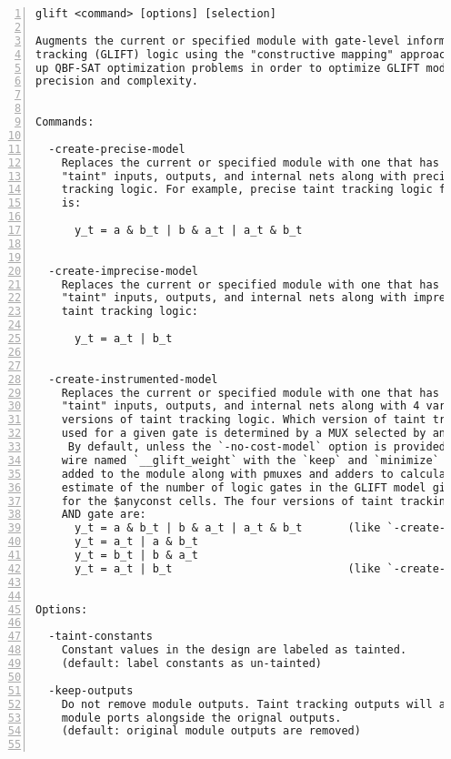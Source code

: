\begin{lstlisting}[numbers=left,frame=single]
    glift <command> [options] [selection]

Augments the current or specified module with gate-level information flow 
tracking (GLIFT) logic using the "constructive mapping" approach. Also can set
up QBF-SAT optimization problems in order to optimize GLIFT models or trade off
precision and complexity.


Commands:

  -create-precise-model
    Replaces the current or specified module with one that has corresponding
    "taint" inputs, outputs, and internal nets along with precise taint
    tracking logic. For example, precise taint tracking logic for an AND gate
    is:

      y_t = a & b_t | b & a_t | a_t & b_t


  -create-imprecise-model
    Replaces the current or specified module with one that has corresponding
    "taint" inputs, outputs, and internal nets along with imprecise "All OR"
    taint tracking logic:

      y_t = a_t | b_t


  -create-instrumented-model
    Replaces the current or specified module with one that has corresponding
    "taint" inputs, outputs, and internal nets along with 4 varying-precision
    versions of taint tracking logic. Which version of taint tracking logic is
    used for a given gate is determined by a MUX selected by an $anyconst cell.
     By default, unless the `-no-cost-model` option is provided, an additional
    wire named `__glift_weight` with the `keep` and `minimize` attributes is
    added to the module along with pmuxes and adders to calculate a rough
    estimate of the number of logic gates in the GLIFT model given an assignment
    for the $anyconst cells. The four versions of taint tracking logic for an
    AND gate are:
      y_t = a & b_t | b & a_t | a_t & b_t       (like `-create-precise-model`)
      y_t = a_t | a & b_t
      y_t = b_t | b & a_t
      y_t = a_t | b_t                           (like `-create-imprecise-model`)


Options:

  -taint-constants
    Constant values in the design are labeled as tainted.
    (default: label constants as un-tainted)

  -keep-outputs
    Do not remove module outputs. Taint tracking outputs will appear in the
    module ports alongside the orignal outputs.
    (default: original module outputs are removed)


\end{lstlisting}
